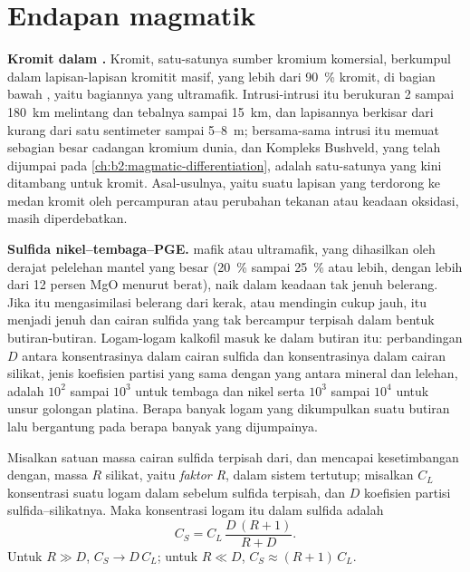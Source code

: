 \section{Endapan magmatik}\label{sec:b2:ore-deposits:magmatic}

\textbf{Kromit dalam .} Kromit, satu-satunya sumber kromium komersial,
berkumpul dalam lapisan-lapisan kromitit masif, yang lebih dari \qty{90}{\percent} kromit, di bagian bawah ,
yaitu bagiannya yang ultramafik. Intrusi-intrusi itu berukuran 2 sampai \qty{180}{km} melintang dan tebalnya sampai
\qty{15}{km}, dan lapisannya berkisar dari kurang dari satu sentimeter sampai 5--\qty{8}{m}; bersama-sama
intrusi itu memuat sebagian besar cadangan kromium dunia, dan Kompleks Bushveld, yang telah dijumpai pada
\cref{ch:b2:magmatic-differentiation}, adalah satu-satunya yang kini ditambang untuk kromit. Asal-usulnya, yaitu suatu
lapisan  yang terdorong ke medan kromit oleh percampuran  atau perubahan tekanan atau
keadaan oksidasi, masih diperdebatkan.

\textbf{Sulfida nikel--tembaga--PGE.}  mafik atau ultramafik, yang dihasilkan oleh derajat pelelehan mantel yang besar
(\qty{20}{\percent} sampai \qty{25}{\percent} atau lebih, dengan lebih dari 12 persen MgO menurut
berat), naik dalam keadaan tak jenuh belerang. Jika  itu mengasimilasi belerang dari kerak, atau mendingin cukup
jauh,  itu menjadi jenuh dan cairan sulfida yang tak bercampur terpisah dalam bentuk butiran-butiran. Logam-logam
kalkofil masuk ke dalam butiran itu: perbandingan $D$ antara konsentrasinya dalam cairan
sulfida dan konsentrasinya dalam cairan silikat, jenis koefisien partisi yang sama dengan yang antara
mineral dan lelehan, adalah $10^2$ sampai $10^3$ untuk tembaga dan nikel serta $10^3$ sampai $10^4$ untuk
unsur golongan platina. Berapa banyak logam yang dikumpulkan suatu butiran lalu bergantung pada berapa banyak  yang dijumpainya.

\begin{proposition}[Faktor R]\label{prop:b2:ore-deposits:r-factor}
Misalkan satuan massa cairan sulfida terpisah dari, dan mencapai kesetimbangan dengan, massa $R$ 
silikat, yaitu \emph{faktor R}, dalam sistem tertutup; misalkan $C_L$ konsentrasi suatu
logam dalam  sebelum sulfida terpisah, dan $D$ koefisien partisi sulfida--silikatnya.
Maka konsentrasi logam itu dalam sulfida adalah
\begin{equation}
C_S = C_L\,\frac{D\,(R + 1)}{R + D} .
\label{eq:b2:ore-deposits:r-factor}
\end{equation}
Untuk $R \gg D$, $C_S \to D\,C_L$; untuk $R \ll D$, $C_S \approx (R + 1)\,C_L$.
\end{proposition}

